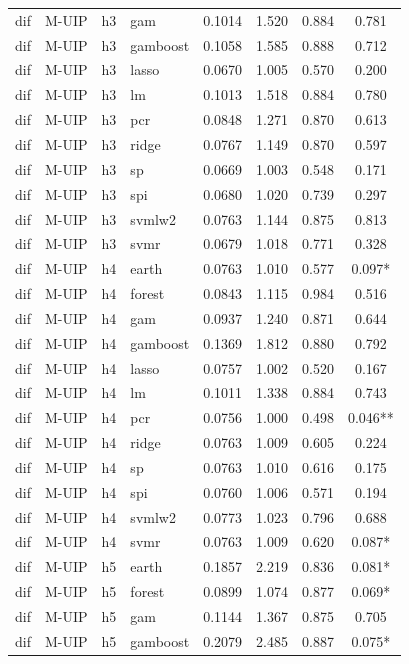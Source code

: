\begin{ThreePartTable}
\begin{longtable}[t]{llclcccc}
dif & M-UIP & h3 & gam & 0.1014 & 1.520 & 0.884 & 0.781\\
dif & M-UIP & h3 & gamboost & 0.1058 & 1.585 & 0.888 & 0.712\\
dif & M-UIP & h3 & lasso & 0.0670 & 1.005 & 0.570 & 0.200\\
dif & M-UIP & h3 & lm & 0.1013 & 1.518 & 0.884 & 0.780\\
dif & M-UIP & h3 & pcr & 0.0848 & 1.271 & 0.870 & 0.613\\
dif & M-UIP & h3 & ridge & 0.0767 & 1.149 & 0.870 & 0.597\\
dif & M-UIP & h3 & sp & 0.0669 & 1.003 & 0.548 & 0.171\\
dif & M-UIP & h3 & spi & 0.0680 & 1.020 & 0.739 & 0.297\\
dif & M-UIP & h3 & svmlw2 & 0.0763 & 1.144 & 0.875 & 0.813\\
dif & M-UIP & h3 & svmr & 0.0679 & 1.018 & 0.771 & 0.328\\
\addlinespace
dif & M-UIP & h4 & earth & 0.0763 & 1.010 & 0.577 & 0.097*\\
dif & M-UIP & h4 & forest & 0.0843 & 1.115 & 0.984 & 0.516\\
dif & M-UIP & h4 & gam & 0.0937 & 1.240 & 0.871 & 0.644\\
dif & M-UIP & h4 & gamboost & 0.1369 & 1.812 & 0.880 & 0.792\\
dif & M-UIP & h4 & lasso & 0.0757 & 1.002 & 0.520 & 0.167\\
dif & M-UIP & h4 & lm & 0.1011 & 1.338 & 0.884 & 0.743\\
dif & M-UIP & h4 & pcr & 0.0756 & 1.000 & 0.498 & 0.046**\\
dif & M-UIP & h4 & ridge & 0.0763 & 1.009 & 0.605 & 0.224\\
dif & M-UIP & h4 & sp & 0.0763 & 1.010 & 0.616 & 0.175\\
dif & M-UIP & h4 & spi & 0.0760 & 1.006 & 0.571 & 0.194\\
dif & M-UIP & h4 & svmlw2 & 0.0773 & 1.023 & 0.796 & 0.688\\
dif & M-UIP & h4 & svmr & 0.0763 & 1.009 & 0.620 & 0.087*\\
\addlinespace
dif & M-UIP & h5 & earth & 0.1857 & 2.219 & 0.836 & 0.081*\\
dif & M-UIP & h5 & forest & 0.0899 & 1.074 & 0.877 & 0.069*\\
dif & M-UIP & h5 & gam & 0.1144 & 1.367 & 0.875 & 0.705\\
dif & M-UIP & h5 & gamboost & 0.2079 & 2.485 & 0.887 & 0.075*\\

\end{longtable}
\end{ThreePartTable}
